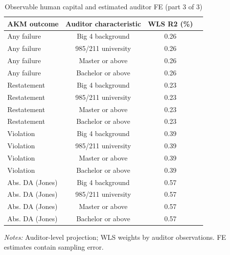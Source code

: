 \begin{table}[htbp]
\footnotesize
\centering
\caption{Observable human capital and estimated auditor FE (part 3 of 3)}
\begin{threeparttable}
\begin{tabular}{p{}ccc}
\toprule
AKM outcome & Auditor characteristic & WLS R2 (\%) &  \\
\midrule
Any failure & Big 4 background & 0.26 &  \\
Any failure & 985/211 university & 0.26 &  \\
Any failure & Master or above & 0.26 &  \\
Any failure & Bachelor or above & 0.26 &  \\
Restatement & Big 4 background & 0.23 &  \\
Restatement & 985/211 university & 0.23 &  \\
Restatement & Master or above & 0.23 &  \\
Restatement & Bachelor or above & 0.23 &  \\
Violation & Big 4 background & 0.39 &  \\
Violation & 985/211 university & 0.39 &  \\
Violation & Master or above & 0.39 &  \\
Violation & Bachelor or above & 0.39 &  \\
Abs. DA (Jones) & Big 4 background & 0.57 &  \\
Abs. DA (Jones) & 985/211 university & 0.57 &  \\
Abs. DA (Jones) & Master or above & 0.57 &  \\
Abs. DA (Jones) & Bachelor or above & 0.57 &  \\
\bottomrule
\end{tabular}
\begin{tablenotes}\footnotesize
\item \raggedright \textit{Notes:} Auditor-level projection; WLS weights by auditor observations. FE estimates contain sampling error.
\end{tablenotes}
\end{threeparttable}
\end{table}
